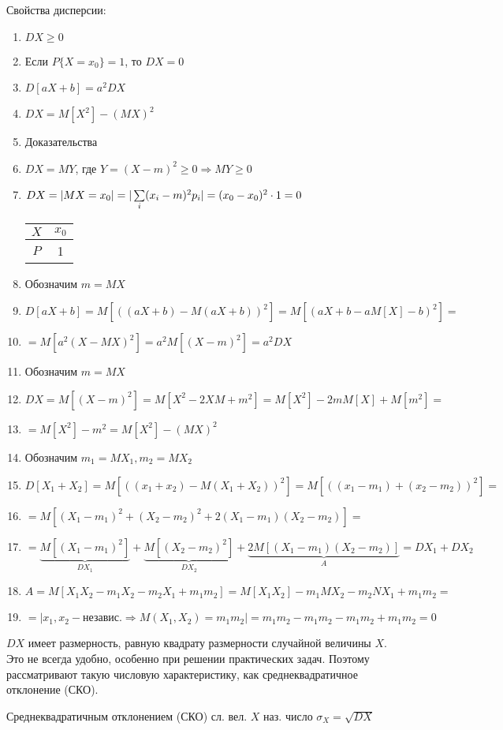 Свойства дисперсии:
\begin{enumerate}[topsep=0pt, leftmargin=20pt, noitemsep, label=\arabic*\degree]
	\item $DX\geq 0$
	
	\item Если $P\{X=x_0\}=1$, то $DX=0$
	
	\item $D[aX+b]=a^2DX$
		
	\item $DX=M[X^2]-(MX)^2$
	
	\item [] Доказательства
	\setcounter{enumi}{0}
	
	\item $DX=MY$, где $Y=(X-m)^2\geq 0\Rightarrow MY\geq 0$
	
	\item $DX=|MX=x_0|=|\sum\limits_{i}(x_i-m)^2p_i|=(x_0-x_0)^2\cdot 1=0$
	\begin{tabular}{ |c|c| } 
		\hline
		$X$ & $x_0$ \\ \hline
		$P$ & 1 \\ \hline
	\end{tabular}
	
	\item Обозначим $m=MX$
	\item [] $D[aX+b]=M[((aX+b) - M(aX+b))^2]=M[(aX+b-aM[X]-b)^2]=$
	\item [] $=M[a^2(X-MX)^2]=a^2M[(X-m)^2]=a^2DX$
	
	\item Обозначим $m=MX$
	\item [] $DX=M[(X-m)^2]=M[X^2-2XM+m^2]=M[X^2]-2mM[X]+M[m^2]=$
	\item [] $=M[X^2]-m^2=M[X^2]-(MX)^2$
	
	\item Обозначим $m_1=MX_1,m_2=MX_2$
	\item [] $D[X_1+X_2]=M[((x_1+x_2)-M(X_1+X_2))^2]=M[((x_1-m_1)+(x_2-m_2))^2]=$
	\item [] $=M[(X_1-m_1)^2+(X_2-m_2)^2+2(X_1-m_1)(X_2-m_2)]=$
	\item [] $=\underbrace{M[(X_1-m_1)^2]}_{DX_1}+\underbrace{M[(X_2-m_2)^2]}_{DX_2}+\underbrace{2M[(X_1-m_1)(X_2-m_2)]}_{A}=DX_1+DX_2$
	\item [] $A=M[X_1X_2-m_1X_2-m_2X_1+m_1m_2]=M[X_1X_2]-m_1MX_2-m_2NX_1+m_1m_2=$
	\item [] $=|x_1,x_2 - \text{независ.}\Rightarrow M(X_1,X_2)=m_1m_2|=m_1m_2-m_1m_2-m_1m_2+m_1m_2=0$

\end{enumerate}

\ZAM $DX$ имеет размерность, равную квадрату размерности случайной величины $X$. Это не всегда удобно, особенно при решении практических задач. Поэтому рассматривают такую числовую характеристику, как среднеквадратичное отклонение (СКО).

\OPR Среднеквадратичным отклонением (СКО) сл. вел. $X$ наз. число $\sigma_X=\sqrt{DX}$

\clearpage
